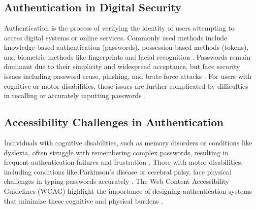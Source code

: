 \chapter{}%
\label{ch:stand-van-zaken}





\section{Authentication in Digital Security}
Authentication is the process of verifying the identity of users attempting to access digital systems or online services. 
Commonly used methods include knowledge-based authentication (passwords), possession-based methods (tokens), and 
biometric methods like fingerprints and facial recognition \autocite{Pant2022}. Passwords remain dominant due to 
their simplicity and widespread acceptance, but face security issues including password reuse, phishing, and 
brute-force attacks \autocite{Ophoff2021}. For users with cognitive or motor disabilities, these issues are 
further complicated by difficulties in recalling or accurately inputting passwords \autocite{Rochford2014}.

\section{Accessibility Challenges in Authentication}
Individuals with cognitive disabilities, such as memory disorders or conditions like dyslexia, often struggle with remembering complex passwords, resulting in frequent authentication failures and frustration \autocite{Farid2019, Ophoff2021}. Those with motor disabilities, including conditions like Parkinson's disease or cerebral palsy, face physical challenges in typing passwords accurately \autocite{Renaud2020}. The Web Content Accessibility Guidelines (WCAG) highlight the importance of designing authentication systems that minimize these cognitive and physical burdens \autocite{Brewer2023}.

\vspace{4\baselineskip}
